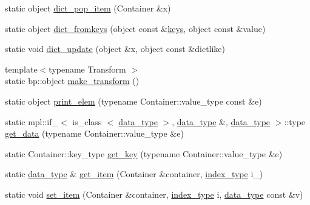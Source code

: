 \begin{DoxyCompactItemize}
\item 
static object \hyperlink{classboost_1_1python_1_1std__map__indexing__suite_af207a28bb4d4a7fa8364139dd0484a84}{dict\-\_\-pop\-\_\-item} (\-Container \&x)
\item 
static object \hyperlink{classboost_1_1python_1_1std__map__indexing__suite_a8aedb678ae655adaf30a5f0200fdeda9}{dict\-\_\-fromkeys} (object const \&\hyperlink{classboost_1_1python_1_1std__map__indexing__suite_a1d08ce35eb71bc9248f64a515d6d9775}{keys}, object const \&value)
\item 
static void \hyperlink{classboost_1_1python_1_1std__map__indexing__suite_a77daf7a1f7b0da0d6035e91dfa118899}{dict\-\_\-update} (object \&x, object const \&dictlike)
\item 
{\footnotesize template$<$typename Transform $>$ }\\static bp\-::object \hyperlink{classboost_1_1python_1_1std__map__indexing__suite_ad2e6c20740dd4ad7058f04e958fc499c}{make\-\_\-transform} ()
\item 
static object \hyperlink{classboost_1_1python_1_1std__map__indexing__suite_a1147c134bf910497fb9a467a21522933}{print\-\_\-elem} (typename \-Container\-::value\-\_\-type const \&e)
\item 
static mpl\-::if\-\_\-$<$ is\-\_\-class\*
$<$ \hyperlink{classboost_1_1python_1_1std__map__indexing__suite_a3e9a6a8b8ba34759cf0ba99fe5966041}{data\-\_\-type} $>$, \hyperlink{classboost_1_1python_1_1std__map__indexing__suite_a3e9a6a8b8ba34759cf0ba99fe5966041}{data\-\_\-type} \*
\&, \hyperlink{classboost_1_1python_1_1std__map__indexing__suite_a3e9a6a8b8ba34759cf0ba99fe5966041}{data\-\_\-type} $>$\-::type \hyperlink{classboost_1_1python_1_1std__map__indexing__suite_a7c13569acfb66f1adb8d92c581091654}{get\-\_\-data} (typename \-Container\-::value\-\_\-type \&e)
\item 
static \-Container\-::key\-\_\-type \hyperlink{classboost_1_1python_1_1std__map__indexing__suite_a28a13c6039a1305e3605c6ca3a9803d9}{get\-\_\-key} (typename \-Container\-::value\-\_\-type \&e)
\item 
static \hyperlink{classboost_1_1python_1_1std__map__indexing__suite_a3e9a6a8b8ba34759cf0ba99fe5966041}{data\-\_\-type} \& \hyperlink{classboost_1_1python_1_1std__map__indexing__suite_a8650d42e8d1d7e095f6cfc9e664f0fab}{get\-\_\-item} (\-Container \&container, \hyperlink{classboost_1_1python_1_1std__map__indexing__suite_a4b2ac75883fba93dbca6d9e83197c842}{index\-\_\-type} i\-\_\-)
\item 
static void \hyperlink{classboost_1_1python_1_1std__map__indexing__suite_a5dc3dd492671db19152e7c64b62e9f97}{set\-\_\-item} (\-Container \&container, \hyperlink{classboost_1_1python_1_1std__map__indexing__suite_a4b2ac75883fba93dbca6d9e83197c842}{index\-\_\-type} i, \hyperlink{classboost_1_1python_1_1std__map__indexing__suite_a3e9a6a8b8ba34759cf0ba99fe5966041}{data\-\_\-type} const \&v)

\end{DoxyCompactItemize}
